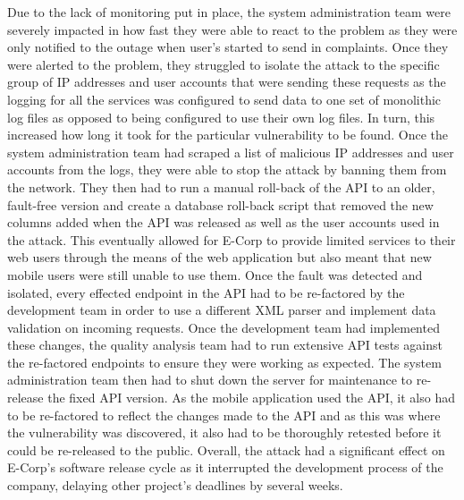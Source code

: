 \documentclass[]{report}
\begin{document}
Due to the lack of monitoring put in place, the system administration team were severely impacted in how fast they were able to react to the problem as they were only notified to the outage when user's started to send in complaints. Once they were alerted to the problem, they struggled to isolate the attack to the specific group of IP addresses and user accounts that were sending these requests as the logging for all the services was configured to send data to one set of monolithic log files as opposed to being configured to use their own log files. In turn, this increased how long it took for the particular vulnerability to be found. Once the system administration team had scraped a list of malicious IP addresses and user accounts from the logs, they were able to stop the attack by banning them from the network. They then had to run a manual roll-back of the API to an older, fault-free version and create a database roll-back script that removed the new columns added when the API was released as well as the user accounts used in the attack. This eventually allowed for E-Corp to provide limited services to their web users through the means of the web application but also meant that new mobile users were still unable to use them. Once the fault was detected and isolated, every effected endpoint in the API had to be re-factored by the development team in order to use a different XML parser and implement data validation on incoming requests. Once the development team had implemented these changes, the quality analysis team had to run extensive API tests against the re-factored endpoints to ensure they were working as expected. The system administration team then had to shut down the server for maintenance to re-release the fixed API version. As the mobile application used the API, it also had to be re-factored to reflect the changes made to the API and as this was where the vulnerability was discovered, it also had to be thoroughly retested before it could be re-released to the public. Overall, the attack had a significant effect on E-Corp's software release cycle as it interrupted the development process of the company, delaying other project's deadlines by several weeks. 
\end{document}
